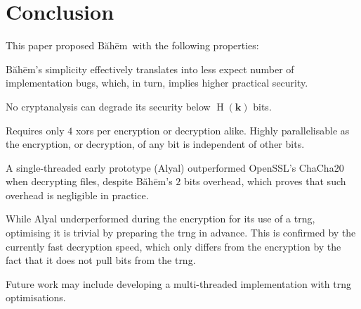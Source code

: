 \documentclass[twocolumn]{article}
\newcommand{\baheem}{Băhēm}
\DeclareMathOperator{\entropy}{H}
\begin{document}
\section{Conclusion}
This paper proposed \baheem\ with the following properties:
\begin{description}[itemsep=0em]
    \item[Simple.] \baheem's simplicity effectively translates into less
        expect number of implementation bugs, which, in turn, implies
        higher practical security.
    \item[Proven security.] No cryptanalysis can degrade its security
        below $\entropy(\mathbf{k})$ bits.
    \item[Fast.] Requires only $4$ \glspl{xor} per encryption or decryption
        alike.  Highly parallelisable as the encryption, or decryption, of
        any bit is independent of other bits.

        A single-threaded early prototype (Alyal) outperformed OpenSSL's
        ChaCha20 when decrypting files, despite \baheem's $2$ bits
        overhead, which proves that such overhead is negligible in
        practice.

        While Alyal underperformed during the encryption for its use of a
        \gls{trng}, optimising it is trivial by preparing the \gls{trng} in
        advance.  This is confirmed by the currently fast decryption speed,
        which only differs from the encryption by the fact that it does not
        pull bits from the \gls{trng}.
\end{description}

Future work may include developing a multi-threaded implementation with
\gls{trng} optimisations.



\end{document}
